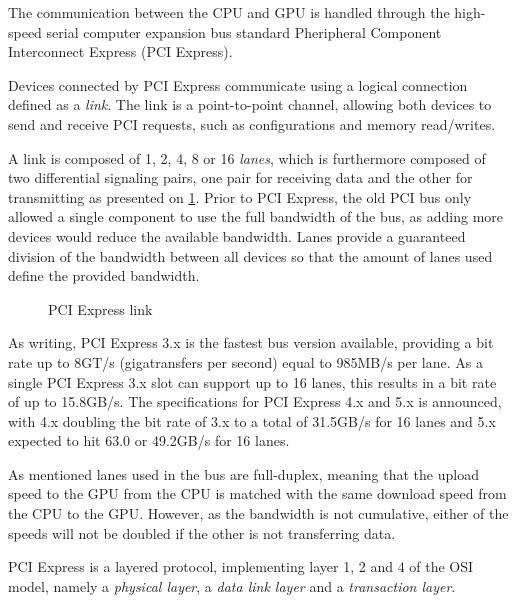 The communication between the CPU and GPU is handled through the high-speed serial computer expansion bus standard Pheripheral Component Interconnect Express (PCI Express).

Devices connected by PCI Express communicate using a logical connection defined as a \textit{link}.
The link is a point-to-point channel, allowing both devices to send and receive PCI requests, such as configurations and memory read/writes.

A link is composed of 1, 2, 4, 8 or 16 \textit{lanes}, which is furthermore composed of two differential signaling pairs, one pair for receiving data and the other for transmitting as presented on \cref{fig:hw-pci-express}.
Prior to PCI Express, the old PCI bus only allowed a single component to use the full bandwidth of the bus, as adding more devices would reduce the available bandwidth.
Lanes provide a guaranteed division of the bandwidth between all devices so that the amount of lanes used define the provided bandwidth.

\begin{figure}[ht]
	\centering
	\caption{PCI Express link}
	\label{fig:hw-pci-express}
\end{figure}



As writing, PCI Express 3.x is the fastest bus version available, providing a bit rate up to 8GT/s (gigatransfers per second) equal to 985MB/s per lane.
As a single PCI Express 3.x slot can support up to 16 lanes, this results in a bit rate of up to 15.8GB/s.
The specifications for PCI Express 4.x and 5.x is announced, with 4.x doubling the bit rate of 3.x to a total of 31.5GB/s for 16 lanes and 5.x expected to hit 63.0 or 49.2GB/s for 16 lanes.

As mentioned lanes used in the bus are full-duplex, meaning that the upload speed to the GPU from the CPU is matched with the same download speed from the CPU to the GPU.
However, as the bandwidth is not cumulative, either of the speeds will not be doubled if the other is not transferring data.

PCI Express is a layered protocol, implementing layer 1, 2 and 4 of the OSI model, namely a \textit{physical layer},  a \textit{data link layer} and a \textit{transaction layer}.
